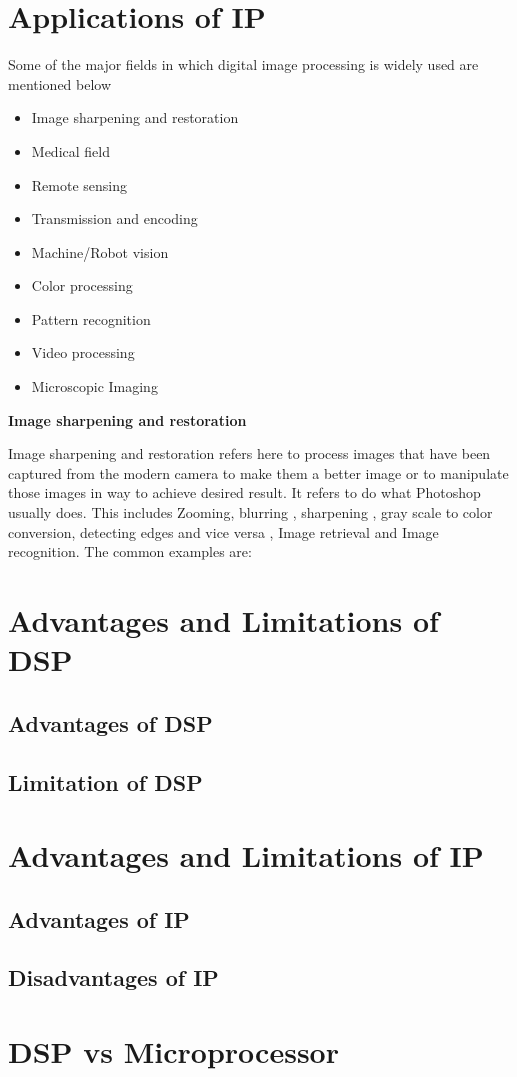 \documentclass{article}
\begin{document}
\begin{multicols}{2}
    \section{Applications of IP\cite{appIP}}
        Some of the major fields in which digital image processing is widely 
        used are mentioned below
        \begin{itemize}
            \item Image sharpening and restoration
            \item Medical field
            \item Remote sensing
            \item Transmission and encoding
            \item Machine/Robot vision
            \item Color processing
            \item Pattern recognition
            \item Video processing
            \item Microscopic Imaging
        \end{itemize}
        \textbf{Image sharpening and restoration}
        \par
        Image sharpening and restoration refers here to process images that 
        have been captured from the modern camera to make them a better image 
        or to manipulate those images in way to achieve desired result. It 
        refers to do what Photoshop usually does. This includes Zooming, 
        blurring , sharpening , gray scale to color conversion, detecting 
        edges and vice versa , Image retrieval and Image recognition. The 
        common examples are: 
    \section{Advantages and Limitations of DSP}
        \subsection{Advantages of DSP}
        \subsection{Limitation of DSP}
    \section{Advantages and Limitations of IP} 
        \subsection{Advantages of IP} 
        \subsection{Disadvantages of IP} 
    \section{DSP vs Microprocessor}
    \end{multicols}
\end{document}
